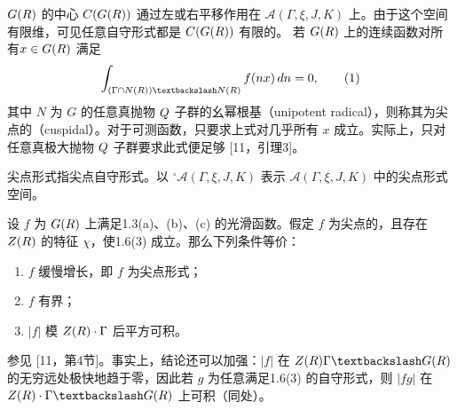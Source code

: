 $G(R)$ 的中心 $C(G(R))$ 通过左或右平移作用在 $\mathcal A(\Gamma,\xi,J,K)$ 上。由于这个空间有限维，可见任意自守形式都是 $C(G(R))$ 有限的。
若 $G(R)$ 上的连续函数对所有$x\in G(R)$ 满足
\[
\int_{(\Gamma\cap N(\R))\backslash N(\R)}f(nx)\,dn=0,\tag{1}
\]
其中 $N$ 为 $G$ 的任意真抛物 $Q$ 子群的幺幂根基（unipotent radical），则称其为尖点的（cuspidal）。对于可测函数，只要求上式对几乎所有 $x$ 成立。实际上，只对任意真极大抛物 $Q$ 子群要求此式便足够 [11，引理3]。

尖点形式指尖点自守形式。以 $^\circ\mathcal A(\Gamma,\xi,J,K)$ 表示 $\mathcal A(\Gamma,\xi,J,K)$ 中的尖点形式空间。

设 $f$ 为 $G(R)$ 上满足1.3(a)、(b)、(c) 的光滑函数。假定 $f$ 为尖点的，且存在 $Z(R)$ 的特征 $\chi$，使1.6(3) 成立。那么下列条件等价：
\begin{enumerate}
\item[(i)] $f$ 缓慢增长，即 $f$ 为尖点形式；
\item[(ii)] $f$ 有界；
\item[(iii)] $|f|$ 模 $Z(R)\cdot\Gamma$ 后平方可积。
\end{enumerate}
参见 [11，第4节]。事实上，结论还可以加强：$|f|$ 在 $Z(\R)\Gamma\backslash G(\R)$ 的无穷远处极快地趋于零，因此若 $g$ 为任意满足1.6(3) 的自守形式，则 $|f g|$ 在 $Z(\R)\cdot\Gamma\backslash G(\R)$ 上可积（同处）。

